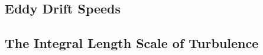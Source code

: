 \subsection{Eddy Drift Speeds}\label{subsec:speeds}


\subsection{The Integral Length Scale of Turbulence}


